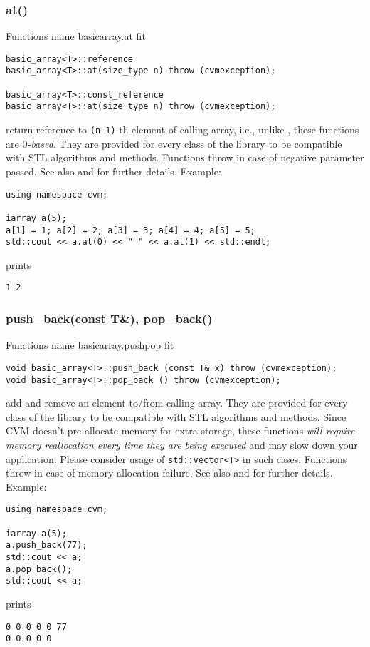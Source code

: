 \subsubsection{at()}
Functions%
\pdfdest name {basicarray.at} fit
\begin{verbatim}
basic_array<T>::reference
basic_array<T>::at(size_type n) throw (cvmexception);

basic_array<T>::const_reference 
basic_array<T>::at(size_type n) throw (cvmexception);
\end{verbatim}
return  reference to  \verb"(n-1)"-th element of calling array, i.e.,
unlike ,
these functions are \emph{$0$-based}.
They are provided for every class of the library to be compatible 
with STL algorithms and methods. 
Functions throw  
in case of negative parameter passed.
See also 
and 
for further details.
Example:
\begin{Verbatim}
using namespace cvm;

iarray a(5);
a[1] = 1; a[2] = 2; a[3] = 3; a[4] = 4; a[5] = 5;
std::cout << a.at(0) << " " << a.at(1) << std::endl;
\end{Verbatim}
prints
\begin{Verbatim}
1 2
\end{Verbatim}
\newpage


\subsubsection{push\_back(const T\&), pop\_back()}
Functions%
\pdfdest name {basicarray.pushpop} fit
\begin{verbatim}
void basic_array<T>::push_back (const T& x) throw (cvmexception);
void basic_array<T>::pop_back () throw (cvmexception);
\end{verbatim}
add and remove an element to/from calling array.
They are provided for every class of the library to be compatible 
with STL algorithms and methods. Since CVM doesn't 
pre-allocate  memory for extra storage, these functions
\emph{will require memory reallocation every time they are being executed}
and may slow down your application. Please consider usage of
\verb"std::vector<T>" in such cases.
Functions throw  
in case of memory allocation failure.
See also 
and 
for further details.
Example:
\begin{Verbatim}
using namespace cvm;

iarray a(5);
a.push_back(77);
std::cout << a;
a.pop_back();
std::cout << a;
\end{Verbatim}
prints
\begin{Verbatim}
0 0 0 0 0 77
0 0 0 0 0
\end{Verbatim}
\newpage


